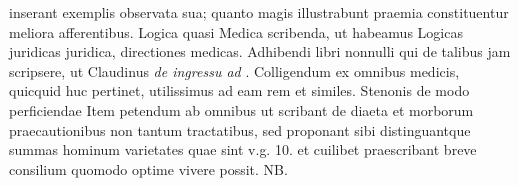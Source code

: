 inserant exemplis observata sua; quanto magis illustrabunt praemia constituentur meliora afferentibus.
%
Logica quasi Medica scribenda, ut habeamus Logicas juridicas
juridica, directiones medicas.%
Adhibendi libri nonnulli qui de talibus jam scripsere,
ut Claudinus\protect{} \textit{de ingressu ad}
.
%
Colligendum ex omnibus medicis, quicquid huc pertinet, utilissimus ad eam rem
et similes. Stenonis\protect{} de modo perficiendae
%
Item petendum ab omnibus ut scribant de diaeta et morborum praecautionibus non tantum tractatibus,
sed proponant sibi distinguantque summas hominum varietates quae sint v.g. 10.
et cuilibet praescribant breve consilium quomodo optime vivere possit. NB.
\pend%
\count{}
\count{}
\count{}
%
